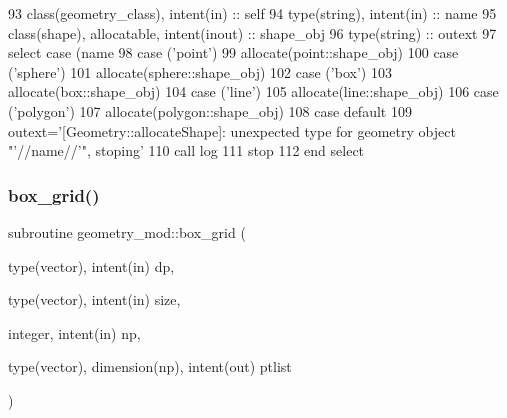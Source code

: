 \begin{DoxyCode}
93     \textcolor{keywordtype}{class}(geometry\_class), \textcolor{keywordtype}{intent(in)} :: self
94     \textcolor{keywordtype}{type}(string), \textcolor{keywordtype}{intent(in)} :: name
95     \textcolor{keywordtype}{class}(shape), \textcolor{keywordtype}{allocatable}, \textcolor{keywordtype}{intent(inout)} :: shape\_obj
96     \textcolor{keywordtype}{type}(string) :: outext
97     \textcolor{keywordflow}{select case} (name%
98     \textcolor{keywordflow}{case} (\textcolor{stringliteral}{'point'})
99         \textcolor{keyword}{allocate}(point::shape\_obj)
100     \textcolor{keywordflow}{case} (\textcolor{stringliteral}{'sphere'})
101         \textcolor{keyword}{allocate}(sphere::shape\_obj)
102     \textcolor{keywordflow}{case} (\textcolor{stringliteral}{'box'})
103         \textcolor{keyword}{allocate}(box::shape\_obj)
104     \textcolor{keywordflow}{case} (\textcolor{stringliteral}{'line'})
105         \textcolor{keyword}{allocate}(line::shape\_obj)
106     \textcolor{keywordflow}{case} (\textcolor{stringliteral}{'polygon'})
107         \textcolor{keyword}{allocate}(polygon::shape\_obj)
108 \textcolor{keywordflow}{        case default}
109         outext=\textcolor{stringliteral}{'[Geometry::allocateShape]: unexpected type for geometry object "'}//name//\textcolor{stringliteral}{'", stoping'}
110         \textcolor{keyword}{call }log%
111         stop
112 \textcolor{keywordflow}{    end select}
\end{DoxyCode}
\mbox{\label{namespacegeometry__mod_ae87e4ecff2d21a839da2b82919b5fd0b}} 
\subsubsection{\texorpdfstring{box\+\_\+grid()}{box\_grid()}}
{\footnotesize\ttfamily subroutine geometry\+\_\+mod\+::box\+\_\+grid (\begin{DoxyParamCaption}\item[{type(vector), intent(in)}]{dp,  }\item[{type(vector), intent(in)}]{size,  }\item[{integer, intent(in)}]{np,  }\item[{type(vector), dimension(np), intent(out)}]{ptlist }\end{DoxyParamCaption})\hspace{0.3cm}{\ttfamily [private]}}




